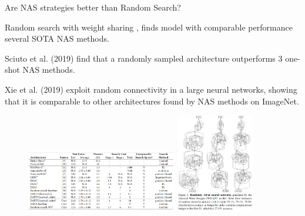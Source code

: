 
\begin{frame}[t]{Are NAS strategies better than Random Search?}
\centering
\begin{itemize}
\footnotesize{
	\item \alert{Random search with weight sharing} , finds model with comparable performance several SOTA NAS methods.
	\item Sciuto et al. (2019) find that a \alert{randomly sampled architecture} outperforms 3 one-shot NAS methods.
	\item Xie et al. (2019) exploit \alert{random connectivity} in a large neural networks, showing that it is comparable to other architectures found by NAS methods on ImageNet.
}
\end{itemize}

\begin{figure}[t!]
    \centering
    \includegraphics[width=0.59\textwidth]{images_lec7/random_cnn.png}
    \includegraphics[width=0.3\textwidth]{images_lec7/randomly_wired.png}
\end{figure}

\end{frame}



